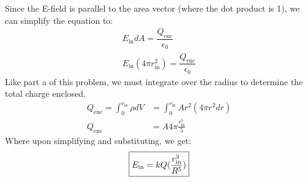 \documentclass{article}
\begin{document}
Since the E-field is parallel to the area vector (where the dot product is 1), we can simplify the equation to:
\begin{align*}
  E_{\text{in}} dA = \dfrac{Q_{\text{enc}}}{\epsilon_0}
  \\ E_{\text{in}} (4\pi r_{\text{in}}^2) = \dfrac{Q_{\text{enc}}}{\epsilon_0}
\end{align*}
Like part a of this problem, we must integrate over the radius to determine the total charge enclosed.
\begin{align*}
  Q_{\text{enc}} = \int_{0}^{r_{\text{in}}} \rho dV &= \int_{0}^{r_{\text{in}}} Ar^2 (4\pi r^2 dr)
  \\ Q_{\text{enc}} &= A4\pi \frac{r_{\text{in}}^5}{5}
\end{align*}
Where upon simplifying and substituting, we get:
$$\boxed{E_{\text{\text{in}}} = kQ(\dfrac{r_{\text{in}}^3}{R^5})} $$
\newpage
\end{document}
